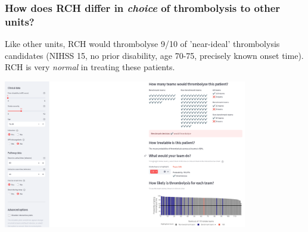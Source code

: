\begin{frame}
\frametitle{\large{How does RCH differ in \textit{choice} of thrombolysis to other units?}}

\small
Like other units, RCH would thrombolyse 9/10 of 'near-ideal' thrombolysis candidates (NIHSS 15, no prior disability, age 70-75, precisely known onset time). RCH is very \textit{normal} in treating these patients.


\begin{center}

\includegraphics[width=0.80\textwidth]{./Truro/truro_perfect}

\small

    
\end{center}


\end{frame}